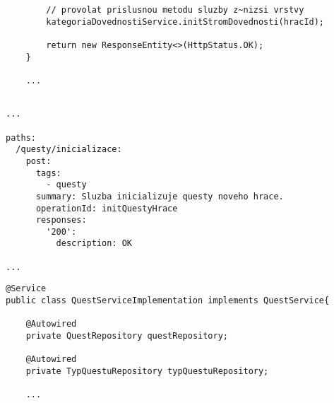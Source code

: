 \documentclass[twoside, 12pt]{article}
\begin{document}
{{\begin{lstlisting}
        // provolat prislusnou metodu sluzby z~nizsi vrstvy
        kategoriaDovednostiService.initStromDovednosti(hracId);

        return new ResponseEntity<>(HttpStatus.OK);
    }

    ...

\end{lstlisting}

\clearpage


\vspace{10}



\vspace{10}


\vspace{10}




\begin{lstlisting}

...

paths:
  /questy/inicializace:
    post:
      tags:
        - questy
      summary: Sluzba inicializuje questy noveho hrace.
      operationId: initQuestyHrace
      responses:
        '200':
          description: OK

...

\end{lstlisting}

\vspace{50}


\begin{lstlisting}
@Service
public class QuestServiceImplementation implements QuestService{

    @Autowired
    private QuestRepository questRepository;

    @Autowired
    private TypQuestuRepository typQuestuRepository;

    ...


\end{lstlisting}}}
\end{document}
